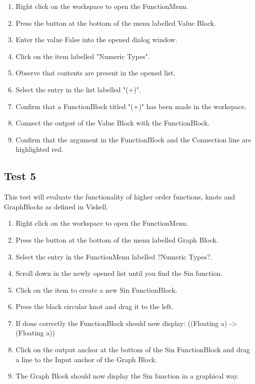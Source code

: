 		\begin{enumerate}
			\item Right click on the workspace to open the FunctionMenu.
			\item Press the button at the bottom of the menu labelled Value Block.
			\item Enter the value False into the opened dialog window.
			\item Click on the item labelled "Numeric Types".
			\item Observe that contents are present in the opened list.
			\item Select the entry in the list labelled "(+)".
			\item Confirm that a FunctionBlock titled "(+)" has been made in the workspace.
			\item Connect the output of the Value Block with the FunctionBlock.
			\item Confirm that the argument in the FunctionBlock and the Connection line are highlighted red.
		\end{enumerate}
	
	\subsection{Test 5}
		This test will evaluate the functionality of higher order functions, knots and GraphBlocks as defined in Viskell.
		
		\begin{enumerate}
			\item Right click on the workspace to open the FunctionMenu.
			\item Press the button at the bottom of the menu labelled Graph Block.
			\item Select the entry in the FunctionMenu labelled ?Numeric Types?.
			\item	Scroll down in the newly opened list until you find the Sin function.
			\item Click on the item to create a new Sin FunctionBlock.
			\item Press the black circular knot and drag it to the left.
			\item If done correctly the FunctionBlock should now display: ((Floating a) -> (Floating a))
			\item Click on the output anchor at the bottom of the Sin FunctionBlock and drag a line to the Input anchor of the Graph Block.
			\item The Graph Block should now display the Sin function in a graphical way.
		\end{enumerate}

